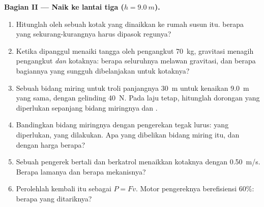 \begin{problem}
\medskip
\noindent\textbf{Bagian II --- Naik ke lantai tiga ($h = \qty{9.0}{m}$).}
\begin{enumerate}[resume]
  \item Hitunglah  oleh  sebuah kotak yang dinaikkan ke rumah
        susun itu.  berapa yang sekurang-kurangnya harus dipasok
        regunya?
  \item Ketika dipanggul menaiki tangga oleh pengangkut \qty{70}{kg},
        gravitasi menagih pengangkut \emph{dan} kotaknya: berapa 
        seluruhnya melawan gravitasi, dan berapa bagiannya yang
        sungguh dibelanjakan untuk kotaknya?
  \item Sebuah bidang miring untuk troli panjangnya \qty{30}{m} untuk
        kenaikan \qty{9.0}{m} yang sama, dengan  gelinding
        \qty{40}{N}. Pada laju tetap, hitunglah dorongan yang
        diperlukan sepanjang bidang miringnya dan .
  \item Bandingkan bidang miringnya dengan pengerekan tegak lurus:
         yang diperlukan,  yang dilakukan. Apa yang dibelikan
        bidang miring itu, dan dengan harga berapa?
  \item Sebuah pengerek bertali dan berkatrol menaikkan kotaknya dengan
        \qty{0.50}{m/s}. Berapa lamanya dan berapa  mekanisnya?
  \item Perolehlah kembali  itu sebagai $P = Fv$. Motor pengereknya
        berefisiensi $60\%$: berapa  yang ditariknya?
\end{enumerate}


\end{problem}
